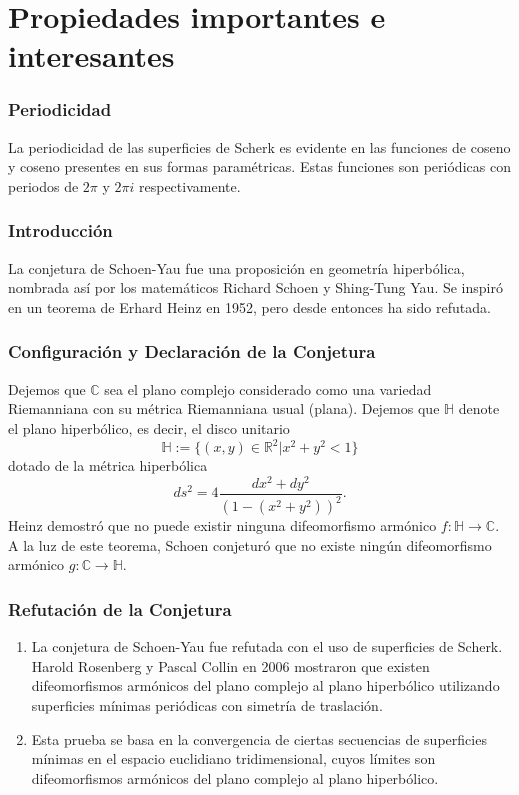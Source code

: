 \documentclass[10pt]{beamer}
\begin{document}
\section{Propiedades importantes e interesantes}

  \begin{frame}
  \frametitle{Periodicidad}
  La periodicidad de las superficies de Scherk es evidente en las funciones de coseno y coseno presentes en sus formas paramétricas. Estas funciones son periódicas con periodos de $2\pi$ y $2\pi i$ respectivamente.
  \end{frame}
  
  \begin{frame}
  \frametitle{Introducción}
  La conjetura de Schoen-Yau fue una proposición en geometría hiperbólica, nombrada así por los matemáticos Richard Schoen y Shing-Tung Yau. Se inspiró en un teorema de Erhard Heinz en 1952, pero desde entonces ha sido refutada.
  \end{frame}
  
  \begin{frame}
  \frametitle{Configuración y Declaración de la Conjetura}
  Dejemos que $\mathbb{C}$ sea el plano complejo considerado como una variedad Riemanniana con su métrica Riemanniana usual (plana). Dejemos que $\mathbb{H}$ denote el plano hiperbólico, es decir, el disco unitario
  \[
  \mathbb{H}:=\{(x,y)\in \mathbb{R}^{2}|x^{2}+y^{2}<1\}
  \]
  dotado de la métrica hiperbólica
  \[
  ds^{2}=4\frac {dx^{2}+dy^{2}}{(1-(x^{2}+y^{2}))^{2}}.
  \]
  Heinz demostró que no puede existir ninguna difeomorfismo armónico $f:\mathbb{H}\to \mathbb{C}$. A la luz de este teorema, Schoen conjeturó que no existe ningún difeomorfismo armónico $g:\mathbb{C}\to \mathbb{H}$.
  \end{frame}
  

  

  \begin{frame}
  \frametitle{Refutación de la Conjetura}
  \begin{enumerate}
    \item La conjetura de Schoen-Yau fue refutada con el uso de superficies de Scherk. Harold Rosenberg y Pascal Collin en 2006 mostraron que existen difeomorfismos armónicos del plano complejo al plano hiperbólico utilizando superficies mínimas periódicas con simetría de traslación. 
    \item Esta prueba se basa en la convergencia de ciertas secuencias de superficies mínimas en el espacio euclidiano tridimensional, cuyos límites son difeomorfismos armónicos del plano complejo al plano hiperbólico.
  \end{enumerate}
  
  \end{frame}
  
\end{document}

